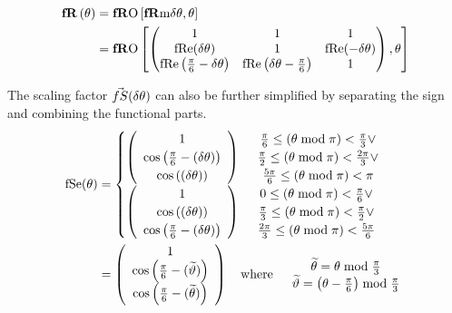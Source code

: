 \begin{align}
\fR[\theta] & = \fRO \left[ \fRm{\thetaA} , \theta \right] \\
& = \fRO \left[
\begin{pmatrix}
 1 & 1 & 1 \\
 \text{fRe} (\thetaA)  & 1 & \text{fRe} (-\thetaA ) \\
 \text{fRe} \left(\frac{\pi }{6}-\thetaA \right) & \text{fRe} \left(\thetaA -\frac{\pi }{6}\right) & 1 \\
\end{pmatrix} , \theta \right]
\end{align}

The scaling factor $\fS ( \thetaA )$ can also be further simplified by separating the sign and combining the functional parts.
\begin{align}
\fSe(\theta) 
&=
\begin{cases}
 \left(
\begin{array}{c}
 1 \\
 \cos \left(\frac{\pi }{6}-(\thetaA)\right) \\
 \cos \left((\thetaA)\right) \\
\end{array}
\right) & 
\begin{array}{c}
\frac{\pi }{6}\leq (\theta  \bmod \pi )<\frac{\pi }{3}\lor \\
\frac{\pi }{2}\leq (\theta  \bmod \pi )<\frac{2 \pi }{3}\lor \\
\frac{5 \pi}{6}\leq (\theta  \bmod \pi )<\pi  \\
\end{array} \\
 \left(
\begin{array}{c}
 1 \\
 \cos \left((\thetaA)\right) \\
 \cos \left(\frac{\pi }{6}-(\thetaA)\right) \\
\end{array}
\right)  & 
\begin{array}{c}
0\leq (\theta  \bmod \pi )<\frac{\pi }{6}\lor \\
\frac{\pi }{3}\leq (\theta  \bmod \pi ) < \frac{\pi }{2}\lor \\
\frac{2 \pi }{3}\leq (\theta \bmod \pi ) <\frac{5 \pi }{6} \\
\end{array}
\end{cases} \\
&= 
\left(
\begin{array}{c}
 1 \\
 \cos \left(\frac{\pi }{6}-(\widetilde{\vartheta})\right) \\
 \cos \left(\frac{\pi }{6}-(\widetilde{\theta} )\right) \\
\end{array}
\right) 
\quad \text{where}  \quad 
\begin{array}{c}
\widetilde{\theta} = \theta  \bmod \frac{\pi }{3} \\ 
\widetilde{\vartheta} = \left(\theta - \Pii{6}\right) \bmod \frac{\pi }{3}
\end{array}
\end{align}

